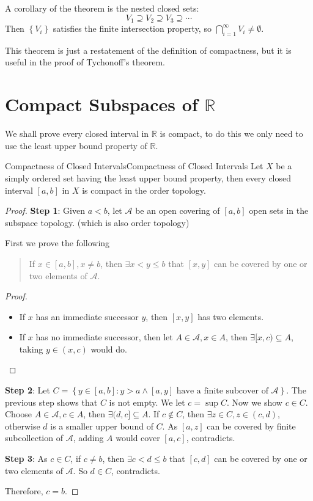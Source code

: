 \documentclass[../main.tex]{subfiles}
\begin{document}
A corollary of the theorem is the nested closed sets:
\begin{equation*}
 V_1 \supseteq V_2 \supseteq V_3 \supseteq \cdots
\end{equation*}
Then $\left\{ V_i \right\}$ satisfies the finite intersection property, so $\bigcap_{i=1}^{\infty} V_i \neq \emptyset$.

This theorem is just a restatement of the definition of compactness, but it is useful in the proof of Tychonoff's theorem.

\section{Compact Subspaces of $\mathbb{R}$}

We shall prove every closed interval in $\mathbb{R}$ is compact, to do this we only need to use the least upper bound property of $\mathbb{R}$.

\begin{theorem}{Compactness of Closed Intervals}{Compactness of Closed Intervals}
	Let $X$ be a simply ordered set having the least upper bound property, then every closed interval $[a,b]$ in $X$ is compact in the order topology.
\end{theorem}
\begin{proof}
\textbf{Step 1}: Given $a<b$, let $\mathcal{A}$ be an open covering of $[a,b]$ open sets in the subspace topology. (which is also order topology)

	First we prove the following
	\begin{quote}
		If $x\in [a,b],x\neq b$, then $\exists x<y\leq b$ that $[x,y]$ can be covered by one or two elements of $\mathcal{A}$.
	\end{quote}
	\begin{proof}
	\begin{itemize}
		\item If $x$ has an immediate successor $y$, then $[x,y]$ has two elements.
		\item If $x$ has no immediate successor, then let $A\in \mathcal{A},x\in A$, then $\exists [x,c) \subseteq A$, taking $y\in (x,c)$ would do.
	\end{itemize}
	\end{proof}

	\textbf{Step 2}: Let $C = \left\{ y\in [a,b]: y>a\land [a,y] \text{ have a finite subcover of } \mathcal{A} \right\}$. The previous step shows that $C$ is not empty. We let $c = \sup C$. Now we show $c\in C$. Choose $A\in \mathcal{A},c\in A$, then $\exists (d,c] \subseteq A$. If $c\notin C$, then $\exists z\in C,z\in(c,d)$, otherwise $d$ is a smaller upper bound of $C$. As $[a,z]$ can be covered by finite subcollection of $\mathcal{A}$, adding $A$ would cover $[a,c]$, contradicts.

	\textbf{Step 3}: As $c\in C$, if  $c\neq b$, then $\exists c<d\leq b$ that $[c,d]$ can be covered by one or two elements of $\mathcal{A}$. So $d\in C$, contradicts.

	Therefore, $c=b$.
\end{proof}
\end{document}

